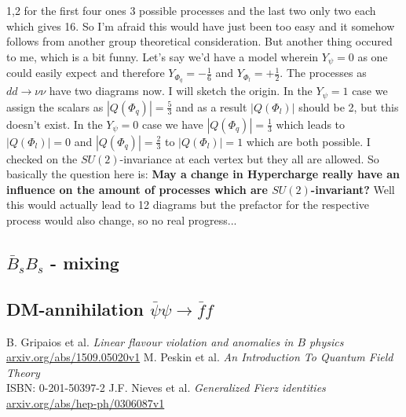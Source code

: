 \documentclass[11pt,a4paper,twoside]{article}
\begin{document}
\begin{spacing}{1,2}
for the first four ones 3 possible processes and the last two only two each which gives 16. So I'm afraid this would have just been too easy and it somehow
follows from another group theoretical consideration. But another
thing occured to me, which is a bit funny. Let's say we'd have a model wherein $Y_\psi=0$ as one could easily expect and therefore $Y_{\Phi_q} = -\frac16$ and
$Y_{\Phi_l}= +\frac12$. The processes as $dd\rightarrow \nu\nu$ have two diagrams now. I will sketch the origin. In the $Y_\psi = 1$ case we assign the 
scalars as $|Q(\Phi_q)|=\frac53$ and as a result $|Q(\Phi_l)|$ should be 2, but this doesn't exist. In the $Y_\psi = 0$ case we have $|Q(\Phi_q)|=\frac13$
which leads to $|Q(\Phi_l)|=0$ and $|Q(\Phi_q)|=\frac23$ to $|Q(\Phi_l)|=1$ which are both possible. I checked on the $SU(2)$-invariance at each vertex but
they all are allowed. So basically the question here is: \textbf{May a change in Hypercharge really have an influence on the amount of processes which are
$SU(2)$-invariant?} Well this would actually lead to 12 diagrams but the prefactor for the respective process would also change, so no real progress...

\subsection{$\bar B_s B_s$ - mixing}
\subsection{DM-annihilation $\bar \psi\psi \rightarrow \bar f f$ }



\newpage
\end{spacing}
\newpage
\begin{thebibliography}{xxx}
 B. Gripaios et al. \textit{Linear flavour violation and anomalies in $B$ physics}\\ \href{http://arxiv.org/abs/1509.05020v1}{arxiv.org/abs/1509.05020v1}
 M. Peskin et al. \textit{An Introduction To Quantum Field Theory}\\ ISBN: 0-201-50397-2
 J.F. Nieves et al. \textit{Generalized Fierz identities}\\ \href{http://http://arxiv.org/abs/hep-ph/0306087v1}{arxiv.org/abs/hep-ph/0306087v1}
\end{thebibliography}
\end{document}
